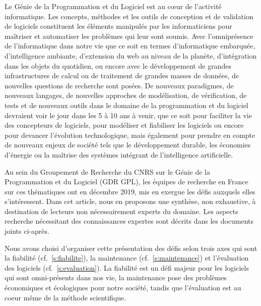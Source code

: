 \documentclass[11pt]{article}
\newcommand{\cf}[0]{cf.~}
\begin{document}
Le Génie de la Programmation et du Logiciel est au c{\oe}ur de l'activité
informatique. Les concepts, méthodes et les outils de conception et de
validation de logiciels constituent les éléments manipulés par les
informaticiens pour maîtriser et automatiser les problèmes qui leur sont
soumis. Avec l'omniprésence de l'informatique dans notre vie que ce soit en termes
d'informatique embarquée, d'intelligence ambiante, d'extension du web au niveau
de la planète, d'intégration dans les objets du quotidien, ou encore avec le
développement de grandes infrastructures de calcul ou de traitement de grandes
masses de données, de nouvelles questions de recherche sont posées.
De nouveaux paradigmes, de nouveaux langages, de nouvelles approches de
modélisation, de vérification, de tests et de nouveaux outils dans le domaine
de la programmation et du logiciel devraient voir le jour dans les 5 à 10 ans à
venir, que ce soit pour faciliter la vie des concepteurs de logiciels, pour
modéliser et fiabiliser les logiciels ou encore pour devancer l'évolution
technologique, mais également pour prendre en compte de nouveaux enjeux de
société tels que le développement durable, les économies d'énergie ou la maîtrise des systèmes intégrant de l'intelligence artificielle.

Au sein du Groupement de Recherche du CNRS sur le Génie de la Programmation et du Logiciel (GDR GPL), les équipes de recherche en France sur ces thématiques ont en décembre 2019, mis en exergue les défis auxquels elles s'intéressent. Dans cet article, nous en proposons une synthèse, non exhaustive, à destination de lecteurs non nécessairement experts du domaine. Les aspects recherche nécessitant des connaissances expertes sont décrits dans les documents joints ci-après.


Nous avons choisi d'organiser cette présentation des défis selon trois axes qui sont la fiabilité (\cf\ref{s:fiabilite}), la maintenance (\cf\ref{s:maintenance}) et l'évaluation des logiciels (\cf\ref{s:evaluation}). La fiabilité est un défi majeur pour les logiciels qui sont omni-présents dans nos vie, la maintenance pose des problèmes économiques et écologiques pour notre société, tandis que l'évaluation est au coeur même de la méthode scientifique.
\end{document}
